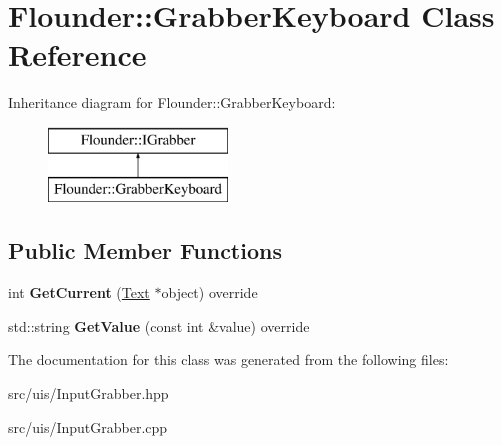 \hypertarget{class_flounder_1_1_grabber_keyboard}{}\section{Flounder\+:\+:Grabber\+Keyboard Class Reference}
\label{class_flounder_1_1_grabber_keyboard}
Inheritance diagram for Flounder\+:\+:Grabber\+Keyboard\+:\begin{figure}[H]
\begin{center}
\leavevmode
\includegraphics[height=2.000000cm]{class_flounder_1_1_grabber_keyboard}
\end{center}
\end{figure}
\subsection*{Public Member Functions}
\begin{DoxyCompactItemize}
\item 
\mbox{\label{class_flounder_1_1_grabber_keyboard_a6c129e91b2c0092029dddeb83cefcd3e}} 
int {\bfseries Get\+Current} (\hyperlink{class_flounder_1_1_text}{Text} $\ast$object) override
\item 
\mbox{\label{class_flounder_1_1_grabber_keyboard_a9bf4065c4d85891670468a6cebd42443}} 
std\+::string {\bfseries Get\+Value} (const int \&value) override
\end{DoxyCompactItemize}


The documentation for this class was generated from the following files\+:\begin{DoxyCompactItemize}
\item 
src/uis/Input\+Grabber.\+hpp\item 
src/uis/Input\+Grabber.\+cpp\end{DoxyCompactItemize}
